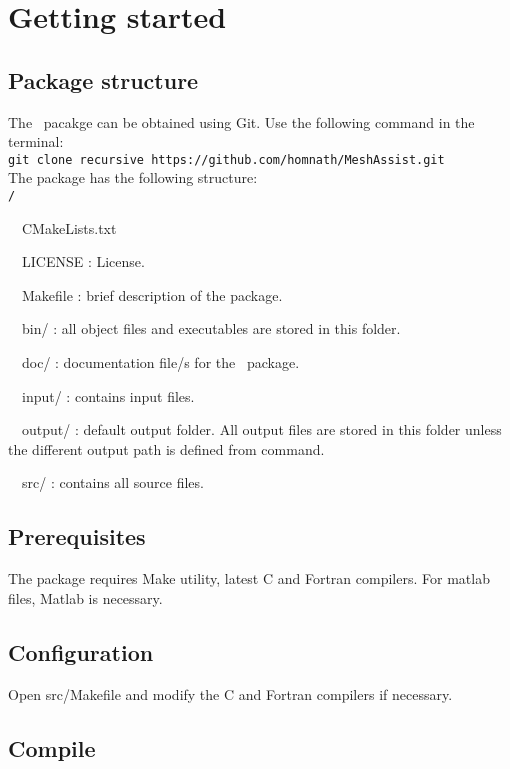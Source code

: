 \chapter{Getting started}
\label{chap:start}
\section{Package structure}
The \pack\ pacakge can be obtained using Git. Use the following command in the terminal:\\

\texttt{git clone \-\-recursive https://github.com/homnath/MeshAssist.git}\\

The package has the following structure:\\

\texttt{\pack/}
\begin{adescription}{~~CMakeLists.txt}
\item[~~LICENSE]               : License.
\item[~~Makefile]                : brief description of the package.
\item[~~bin/]                  : all object files and executables are stored in this folder.
\item[~~doc/]                  : documentation file/s for the \pack\ package.
\item[~~input/]                : contains input files.
\item[~~output/]               : default output folder. All output files are stored in this folder unless the different output path is defined from command.
\item[~~src/]                  : contains all source files.
\end{adescription}
 
\section{Prerequisites}

The package requires Make utility, latest C and Fortran compilers. For matlab files, Matlab is necessary.

\section{Configuration}

Open src/Makefile and modify the C and Fortran compilers if necessary.

\section{Compile}

